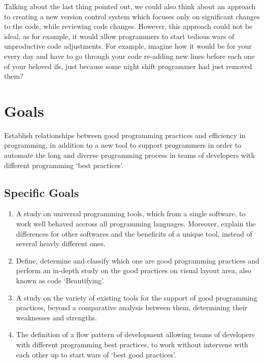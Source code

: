 {    Talking about the last thing pointed out, we could also think about an approach to creating a
    new version control system which focuses only on significant changes to the code, while
    reviewing code changes. However, this approach could not be ideal, as for example, it would
    allow programmers to start tedious wars of unproductive code adjustments. For example, imagine
    how it would be for your every day and have to go through your code re-adding new lines before
    each one of your beloved if\textquotesingle s, just because some night shift programmer had just
    removed them? %

    \section{Goals}

    Establish relationships between good programming practices and efficiency in programming, in
    addition to a new tool to support programmers in order to automate the long and diverse
    programming process in teams of developers with different programming `best practices'.

    \subsection{Specific Goals}

    \begin{enumerate}
        \item A study on universal programming tools, which from a single software, to work well
        behaved accross all programming languages. Moreover, explain the differences for other
        softwares and the beneficits of a unique tool, instead of several heavly different ones.

        \item Define, determine and classify which one are good programming practices and perform an
        in-depth study on the good practices on visual layout area, also known as code `Beautifying'.

        \item A study on the variety of existing tools for the support of good programming
        practices, beyond a comparative analysis between them, determining their weaknesses and
        strengths.

        \item The definition of a flow pattern of development allowing teams of developers with
        different programming best practices, to work without intervene with each other up to start
        wars of `best good practices'.


\end{enumerate}}
